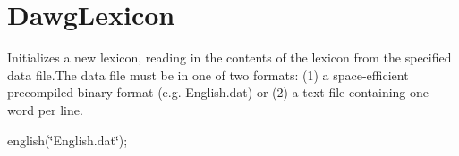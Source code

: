 \hypertarget{DawgLexicon-example}{}\section{Dawg\+Lexicon}
Initializes a new lexicon, reading in the contents of the lexicon from the specified data file.\+The data file must be in one of two formats\+: (1) a space-\/efficient precompiled binary format (e.\+g. English.\+dat) or (2) a text file containing one word per line.

english(\char`\"{}\+English.\+dat\char`\"{});


\begin{DoxyCodeInclude}
\end{DoxyCodeInclude}
 